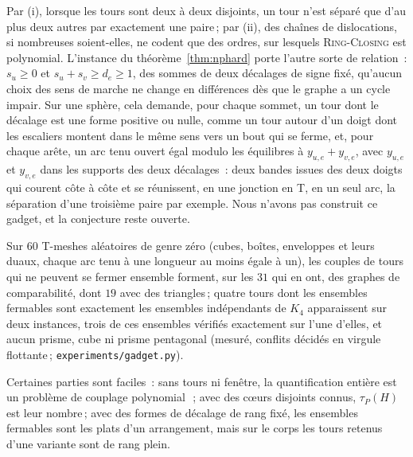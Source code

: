 \documentclass[11pt,a4paper]{article}
\newcommand{\shift}{s}
\newcommand{\RC}{\textup{\textsc{Ring-Closing}}}
\begin{document}
Par (i), lorsque les tours sont deux à deux disjoints, un tour n'est séparé
que d'au plus deux autres par exactement une paire\,; par (ii), des chaînes de dislocations, si nombreuses soient-elles, ne
codent que des ordres, sur lesquels \RC{} est polynomial. L'instance du
théorème~\ref{thm:nphard} porte l'autre sorte de relation~: $\shift_u \ge 0$
et $\shift_u + \shift_v \ge d_e \ge 1$, des sommes de deux décalages de signe
fixé, qu'aucun choix des sens de marche ne change en différences dès que le
graphe a un cycle impair. Sur une sphère, cela demande, pour chaque sommet, un
tour dont le décalage est une forme positive ou nulle, comme un tour autour
d'un doigt dont les escaliers montent dans le même sens vers un bout qui se
ferme, et, pour chaque arête, un arc tenu ouvert égal modulo les équilibres à
$y_{u,e} + y_{v,e}$, avec $y_{u,e}$ et $y_{v,e}$ dans les supports des deux
décalages~: deux bandes issues des deux doigts qui courent côte à côte et se
réunissent, en une jonction en T, en un seul arc, la séparation d'une
troisième paire par exemple. Nous n'avons pas construit ce gadget, et la
conjecture reste ouverte.

Sur $60$ T-meshes aléatoires de genre zéro (cubes, boîtes, enveloppes et leurs
duaux, chaque arc tenu à une longueur au moins égale à un), les couples de
tours qui ne peuvent se fermer ensemble forment, sur les $31$ qui en ont, des
graphes de comparabilité, dont $19$ avec des triangles\,; quatre tours dont
les ensembles fermables sont exactement les ensembles indépendants de $K_4$
apparaissent sur deux instances, trois de ces ensembles vérifiés exactement
sur l'une d'elles, et aucun prisme, cube ni prisme pentagonal (mesuré, conflits décidés en virgule flottante\,;
\texttt{experiments/gadget.py}).

Certaines parties sont faciles~: sans tours ni fenêtre, la quantification
entière est un problème de couplage polynomial~\cite{edmonds1970matching}\,;
avec des cœurs disjoints connus, $\tau_P(H)$ est leur nombre\,; avec des
formes de décalage de rang fixé, les ensembles fermables sont les plats d'un
arrangement, mais sur le corps les tours retenus d'une variante sont de rang
plein. %
\end{document}
